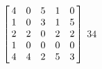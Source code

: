 {$\left[\hskip -3pt \begin{array}{ccccc} 4&0&5&1&0\\  1&0&3&1&5
\\  2&2&0&2&2\\  1&0&0&0&0
\\  4&4&2&5&3\end{array}\hskip -3pt \right]$} 
{$34$}



  

